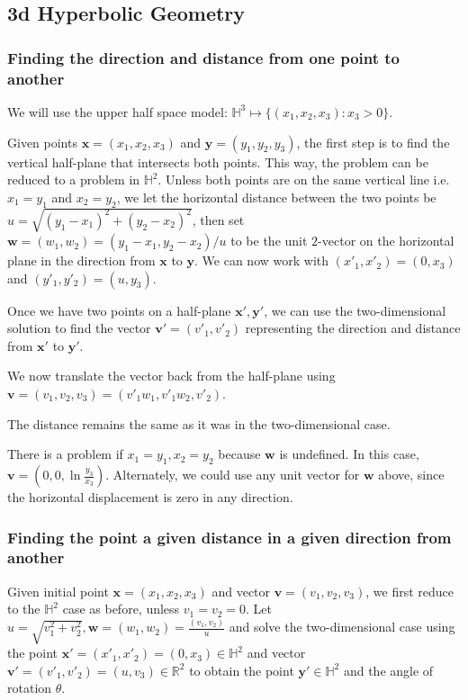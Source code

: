 \subsection{3d Hyperbolic Geometry}

\subsubsection{Finding the direction and distance from one point to another}

We will use the upper half space model: $\mathbb{H}^3 \mapsto \{(x_1,x_2,x_3):x_3 > 0\}$.

Given points $\textbf{x} = (x_1,x_2,x_3)$ and $\textbf{y} = (y_1,y_2,y_3)$, the first step is to find the vertical half-plane that intersects both points. This way, the problem can be reduced to a problem in $\mathbb{H}^2$. Unless both points are on the same vertical line i.e. $x_1 = y_1$ and $x_2 = y_2$, we let the horizontal distance between the two points be $u = \sqrt{(y_1-x_1)^2 + (y_2-x_2)^2}$, then set $\textbf{w} = (w_1,w_2) = (y_1-x_1,y_2-x_2)/u$ to be the unit $2$-vector on the horizontal plane in the direction from $\textbf{x}$ to $\textbf{y}$. We can now work with $(x'_1,x'_2) = (0,x_3)$ and $(y'_1,y'_2) = (u,y_3)$.

Once we have two points on a half-plane $\textbf{x}', \textbf{y}'$, we can use the two-dimensional solution to find the vector $\textbf{v}' = (v'_1,v'_2)$ representing the direction and distance from $\textbf{x}'$ to $\textbf{y}'$.

We now translate the vector back from the half-plane using $\textbf{v} = (v_1,v_2,v_3) = (v'_1w_1,v'_1w_2,v'_2)$.

The distance remains the same as it was in the two-dimensional case.

There is a problem if $x_1 = y_1, x_2 = y_2$ because $\textbf{w}$ is undefined. In this case, $\textbf{v} = (0,0,\ln\frac{y_3}{x_3})$. Alternately, we could use any unit vector for $\textbf{w}$ above, since the horizontal displacement is zero in any direction.

\subsubsection{Finding the point a given distance in a given direction from another}

Given initial point $\textbf{x} = (x_1,x_2,x_3)$ and vector $\textbf{v} = (v_1,v_2,v_3)$, we first reduce to the $\mathbb{H}^2$ case as before, unless $v_1 = v_2 = 0$. Let $u = \sqrt{v_1^2+v_2^2}, \textbf{w} = (w_1,w_2) = \frac{(v_1,v_2)}{u}$ and solve the two-dimensional case using the point $\textbf{x}' = (x'_1,x'_2) = (0,x_3) \in \mathbb{H}^2$ and vector $\textbf{v}' = (v'_1,v'_2) = (u,v_3) \in \mathbb{R}^2$ to obtain the point $\textbf{y}' \in \mathbb{H}^2$ and the angle of rotation $\theta$.

